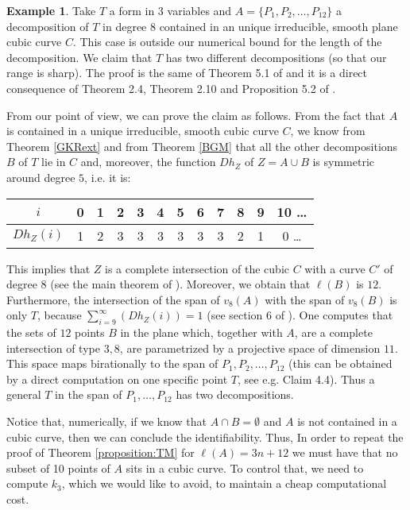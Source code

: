 \documentclass[a4paper,10pt,oneside]{article}
\theoremstyle{casep}
\theoremstyle{definition}
\newtheorem{example}[theorem]{Example}
\begin{document}
\begin{example}
Take $ T $ a form in 3 variables and $ A=\{P_1,P_2,\dots ,P_{12} \} $ a decomposition of $ T $ in degree $ 8 $ contained in an unique irreducible, smooth plane cubic curve $ C $. This case is outside our numerical bound for the length of the decomposition. We claim that $T$ has two different decompositions (so that our range is sharp). The proof is the same of Theorem 5.1 of \cite{CCi06} and it is a direct consequence of Theorem 2.4, Theorem 2.10 and Proposition 5.2 of \cite{CCi06}.

From our point of view, we can prove the claim as follows.
From the fact that $ A $ is contained in a unique irreducible, smooth cubic curve $ C $, we know from Theorem \ref{GKRext} and from Theorem \ref{BGM} that all the other decompositions $B$ of $T$ lie in $C$ and, moreover, the function $Dh_Z$ of $Z=A \cup B$ is symmetric around degree $5$, i.e. it is:
\smallskip
\begin{center}\begin{tabular}{c|ccccccccccc}
		$i$ & 0 & 1 & 2 & 3 & 4 & 5 & 6 & 7 & 8 & 9 & 10 \dots \\ \hline
		$Dh_Z(i)$ & 1 & 2 & 3 & 3 & 3 & 3 & 3 & 3 & 2 & 1 & 0 \dots
	\end{tabular} 
\end{center}
This implies that $ Z $ is a complete intersection of the cubic $ C $ with a curve $ C' $ of degree $ 8 $ (see the main theorem of \cite{Dav84}). Moreover, we obtain that $\ell(B)$ is $12$. Furthermore, the intersection of the span of $v_8(A)$ with the span of $v_8(B)$ is only $T$, because $\sum_{i=9}^\infty (Dh_Z(i))=1$ (see section 6 of \cite{otto}). One computes that the sets of $12$ points $B$ in the plane which, together with $A$, are a complete intersection of type $3,8$, are parametrized by a projective space of dimension $11$. This space maps birationally to the span of $P_1,P_2, \dots,P_{12}$ (this can be obtained by a direct computation on one specific point $T$, see e.g. \cite{AC19} Claim 4.4). Thus a general $T$ in the span of $P_1,\dots ,P_{12}$ has two decompositions. 
\end{example}
Notice that, numerically, if we know that $A \cap B = \emptyset$ and $A$ is not contained in a cubic curve, then we can conclude the identifiability. Thus, In order to repeat the proof of Theorem \ref{proposition:TM} for $\ell(A)=3n+12$ we must have that no subset of 10 points of $A$ sits in a cubic curve. To control that, we need to compute $k_3$, which we would like to avoid, to maintain a cheap computational cost. 
\end{document}
